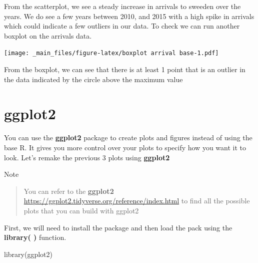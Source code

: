 \documentclass[
]{book}
\newenvironment{Shaded}{\begin{snugshade}}{\end{snugshade}}
\newcommand{\AttributeTok}[1]{\textcolor[rgb]{0.77,0.63,0.00}{#1}}
\newcommand{\CommentTok}[1]{\textcolor[rgb]{0.56,0.35,0.01}{\textit{#1}}}
\newcommand{\DecValTok}[1]{\textcolor[rgb]{0.00,0.00,0.81}{#1}}
\newcommand{\FunctionTok}[1]{\textcolor[rgb]{0.00,0.00,0.00}{#1}}
\newcommand{\NormalTok}[1]{#1}
\newcommand{\SpecialCharTok}[1]{\textcolor[rgb]{0.00,0.00,0.00}{#1}}
\newcommand{\StringTok}[1]{\textcolor[rgb]{0.31,0.60,0.02}{#1}}
\begin{document}
From the scatterplot, we see a steady increase in arrivals to sweeden over the years. We do see a few years between 2010, and 2015 with a high spike in arrivals which could indicate a few outliers in our data. To check we can run another boxplot on the arrivals data.

\begin{Shaded}
\end{Shaded}

\texttt{[image: \_main\_files/figure-latex/boxplot arrival base-1.pdf]}

From the boxplot, we can see that there is at least 1 point that is an outlier in the data indicated by the circle above the maximum value

\hypertarget{ggplot2}{%
\section{ggplot2}\label{ggplot2}}

You can use the \textbf{ggplot2} package to create plots and figures instead of using the base R. It gives you more control over your plots to specify how you want it to look. Let's remake the previous 3 plots using \textbf{ggplot2}

Note

\begin{quote}
You can refer to the \textbf{ggplot2} \url{https://ggplot2.tidyverse.org/reference/index.html} to find all the possible plots that you can build with ggplot2
\end{quote}

First, we will need to install the package and then load the pack using the \textbf{library( )} function.

\begin{Shaded}
\begin{Highlighting}[]
\FunctionTok{library}\NormalTok{(ggplot2)}
\end{Highlighting}
\end{Shaded}
\end{document}
